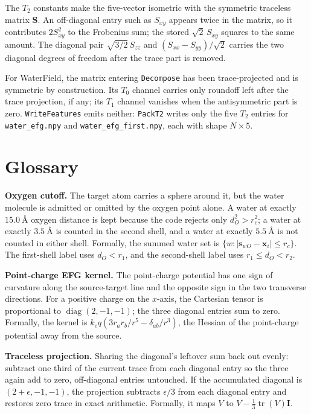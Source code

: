 \documentclass[11pt]{article}
\newcommand{\code}[1]{\texttt{#1}}
\begin{document}
The \(T_2\) constants make the five-vector isometric with the symmetric
traceless matrix \(\bm S\). An off-diagonal entry such as \(S_{xy}\) appears
twice in the matrix, so it contributes \(2S_{xy}^2\) to the Frobenius sum; the
stored \(\sqrt2\,S_{xy}\) squares to the same amount. The diagonal pair
\(\sqrt{3/2}\,S_{zz}\) and \((S_{xx}-S_{yy})/\sqrt2\) carries the two diagonal
degrees of freedom after the trace part is removed.

For WaterField, the matrix entering \code{Decompose} has been trace-projected
and is symmetric by construction. Its \(T_0\) channel carries only roundoff left
after the trace projection, if any; its \(T_1\) channel vanishes when the
antisymmetric part is zero. \code{WriteFeatures} emits neither: \code{PackT2}
writes only the five \(T_2\) entries for \code{water\_efg.npy} and
\code{water\_efg\_first.npy}, each with shape \(N\times5\).

\section{Glossary}

\textbf{Oxygen cutoff.} The target atom carries a sphere around it, but the
water molecule is admitted or omitted by the oxygen point alone. A water at
exactly \(\SI{15.0}{\angstrom}\) oxygen distance is kept because the code
rejects only \(d_O^2>r_c^2\); a water at exactly \(\SI{3.5}{\angstrom}\) is
counted in the second shell, and a water at exactly
\(\SI{5.5}{\angstrom}\) is not counted in either shell. Formally, the summed
water set is \(\{w:|\bm s_{wO}-\bm x_i|\le r_c\}\). The first-shell label uses
\(d_O<r_1\), and the second-shell label uses \(r_1\le d_O<r_2\).

\textbf{Point-charge EFG kernel.} The point-charge potential has one sign of
curvature along the source-target line and the opposite sign in the two
transverse directions. For a positive charge on the \(x\)-axis, the Cartesian
tensor is proportional to \(\operatorname{diag}(2,-1,-1)\); the three diagonal
entries sum to zero. Formally, the kernel is
\(k_eq(3r_ar_b/r^5-\delta_{ab}/r^3)\), the Hessian of the point-charge
potential away from the source.

\textbf{Traceless projection.} Sharing the diagonal's leftover sum back out
evenly: subtract one third of the current trace from each diagonal entry so the
three again add to zero, off-diagonal entries untouched. If the accumulated
diagonal is \((2+\epsilon,-1,-1)\), the projection subtracts \(\epsilon/3\) from
each diagonal entry and restores zero trace in exact arithmetic. Formally, it
maps \(V\) to \(V-\frac13\operatorname{tr}(V)\bm I\).
\end{document}
